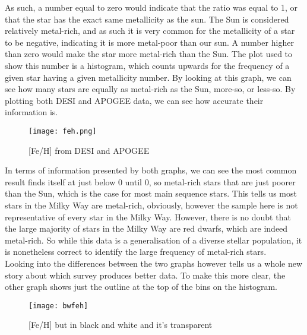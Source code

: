 \documentclass{article}
\begin{document}
\indent As such, a number equal to zero would indicate that the ratio was equal to 1, or that the star has the exact same metallicity as the sun. The Sun is considered relatively metal-rich, and as such it is very common for the metallicity of a star to be negative, indicating it is more metal-poor than our sun. A number higher than zero would make the star more metal-rich than the Sun. The plot used to show this number is a histogram, which counts upwards for the frequency of a given star having a given metallicity number. By looking at this graph, we can see how many stars are equally as metal-rich as the Sun, more-so, or less-so. By plotting both DESI and APOGEE data, we can see how accurate their information is. \begin{figure}[H]
    \centering
    \texttt{[image: feh.png]}
    \caption{[Fe/H] from DESI and APOGEE }
    \label{fig:1}
\end{figure}
\indent In terms of information presented by both graphs, we can see the most common result finds itself at just below 0 until 0, so metal-rich stars that are just poorer than the Sun, which is the case for most main sequence stars. This tells us most stars in the Milky Way are metal-rich, obviously, however the sample here is not representative of every star in the Milky Way. However, there is no doubt that the large majority of stars in the Milky Way are red dwarfs, which are indeed metal-rich. So while this data is a generalisation of a diverse stellar population, it is nonetheless correct to identify the large frequency of metal-rich stars.\\
\indent Looking into the differences between the two graphs however tells us a whole new story about which survey produces better data. To make this more clear, the other graph shows just the outline at the top of the bins on the histogram.\\
\begin{figure}[h!tbp]
    \centering
    \texttt{[image: bwfeh]}
    \caption{[Fe/H] but in black and white and it's transparent}
    \label{fig:2}
\end{figure}
\end{document}
